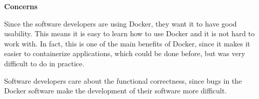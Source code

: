 \textbf{Concerns}
\begin{description}[labelwidth=6cm,labelindent=30pt,style=multiline,leftmargin=5.5cm,font=\normalfont\itshape]




\item[\textbf{Usability}] Since the software developers are using Docker, they want it to have good usability. This means it is easy to learn how to use Docker and it is not hard to work with. In fact, this is one of the main benefits of Docker, since it makes it easier to containerize applications, which could be done before, but was very difficult to do in practice.


\item[\textbf{Functional Suitability} (Functional correctness)] Software developers care about the functional correctness, since bugs in the Docker software make the development of their software more difficult. 

\end{description}

